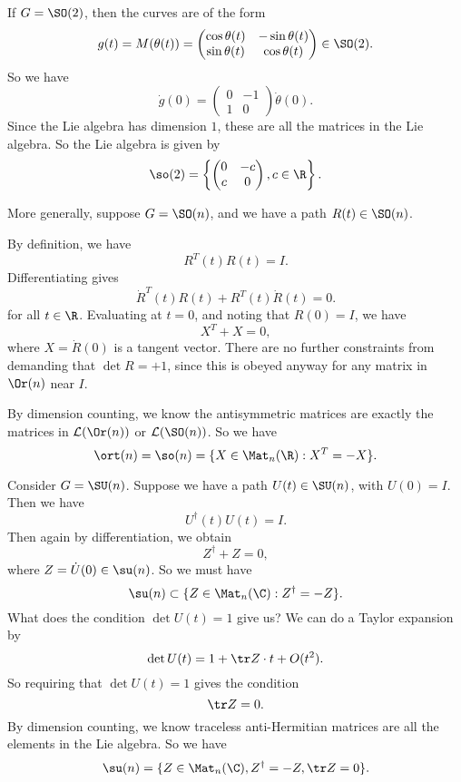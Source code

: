 \documentclass[a4paper]{article}
\begin{document}
\begin{eg}
  If $G = \SO(2)$, then the curves are of the form
  \[
    g(t) = M(\theta(t)) =
    \begin{pmatrix}
      \cos \theta(t) & -\sin \theta (t)\\
      \sin \theta(t) & \cos \theta(t)
    \end{pmatrix} \in \SO(2).
  \]
  So we have
  \[
    \dot{g}(0) =
    \begin{pmatrix}
      0 & -1\\
      1 & 0
    \end{pmatrix} \dot{\theta}(0).
  \]
  Since the Lie algebra has dimension $1$, these are all the matrices in the Lie algebra. So the Lie algebra is given by
  \[
    \so(2) = \left\{
      \begin{pmatrix}
        0 & -c\\
        c & 0
      \end{pmatrix}, c \in \R
    \right\}.
  \]
\end{eg}

\begin{eg}
  More generally, suppose $G = \SO(n)$, and we have a path $R(t) \in \SO(n)$.

  By definition, we have
  \[
    R^T(t) R(t) = I.
  \]
  Differentiating gives
  \[
    \dot{R}^T(t) R(t) + R^T(t) \dot{R}(t) = 0.
  \]
  for all $t \in \R$. Evaluating at $t = 0$, and noting that $R(0) = I$, we have
  \[
    X^T + X = 0,
  \]
  where $X = \dot{R}(0)$ is a tangent vector. There are no further constraints from demanding that $\det R = +1$, since this is obeyed anyway for any matrix in $\Or(n)$ near $I$.

  By dimension counting, we know the antisymmetric matrices are exactly the matrices in $\mathcal{L}(\Or(n))$ or $\mathcal{L}(\SO(n))$. So we have
  \[
    \ort(n) = \so(n) = \{X \in \Mat_n(\R): X^T = -X\}.
  \]
\end{eg}

\begin{eg}
  Consider $G = \SU(n)$. Suppose we have a path $U(t) \in \SU(n)$, with $U(0) = I$. Then we have
  \[
    U^\dagger (t) U(t) = I.
  \]
  Then again by differentiation, we obtain
  \[
    Z^\dagger + Z = 0,
  \]
  where $Z = \dot{U}(0) \in \su(n)$. So we must have
  \[
    \su(n) \subset \{Z \in \Mat_n(\C): Z^\dagger = -Z\}.
  \]
  What does the condition $\det U(t) = 1$ give us? We can do a Taylor expansion by
  \[
    \det U(t) = 1 + \tr Z \cdot t + O(t^2).
  \]
  So requiring that $\det U(t) = 1$ gives the condition
  \[
    \tr Z = 0.
  \]
  By dimension counting, we know traceless anti-Hermitian matrices are all the elements in the Lie algebra. So we have
  \[
    \su(n) = \{Z \in \Mat_n(\C), Z^\dagger = -Z, \tr Z = 0\}.
  \]
\end{eg}
\end{document}
